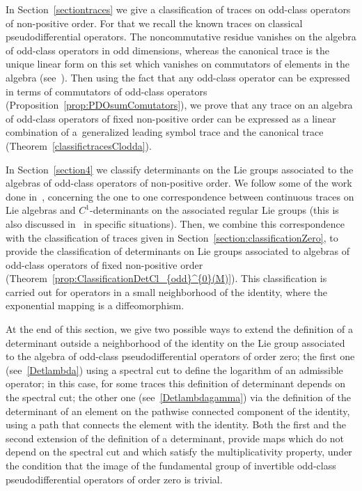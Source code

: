 \documentclass[pdftex]{sigma}
\begin{document}
In Section~\ref{sectiontraces} we give a classif\/ication of traces on odd-class operators of non-positive order. For that we recall the known traces on classical pseudodif\/ferential operators. The noncommutative residue vanishes on the algebra of odd-class operators in odd dimensions, whereas the canonical trace is the unique linear form on this set which vanishes on commutators of elements in the algebra (see~\cite{maniccia}). Then using the fact that any odd-class operator can be expressed in terms of commutators of odd-class operators (Proposition~\ref{prop:PDOsumComutators}), we prove that any trace on an algebra of odd-class operators of f\/ixed non-positive order can be expressed as a linear combination of a~generalized leading symbol trace and the canonical trace (Theorem~\ref{classifictracesClodda}).

In Section~\ref{section4} we classify determinants on the Lie groups associated to the algebras of odd-class operators of non-positive order. We follow some of the work done in~\cite{lescure}, concerning the one to one correspondence between continuous traces on Lie algebras and $C^1$-determinants on the associated regular Lie groups (this is also discussed in~\cite{HarpeSkandalis} in specif\/ic situations). Then, we combine this correspondence with the classif\/ication of traces given in Section~\ref{section:classificationZero}, to provide the classif\/ication of determinants on Lie groups associated to algebras of odd-class operators of f\/ixed non-positive order (Theorem~\ref{prop:ClassificationDetCl_{odd}^{0}(M)}). This classif\/ication is carried out for operators in a small neighborhood of the identity, where the exponential mapping is a dif\/feomorphism.

 At the end of this section, we give two possible ways to extend the def\/inition of a determinant outside a neighborhood of the identity on the Lie group associated to the algebra of odd-class pseudodif\/ferential operators of order zero; the f\/irst one (see~\eqref{Detlambda}) using a spectral cut to def\/ine the logarithm of an admissible operator; in this case, for some traces this def\/inition of determinant depends on the spectral cut; the other one (see~\eqref{Detlambdagamma}) via the def\/inition of the determinant of an element on the pathwise connected component of the identity, using a path that connects the element with the identity. Both the f\/irst and the second extension of the def\/inition of a determinant, provide maps which do not depend on the spectral cut and which satisfy the multiplicativity property, under the condition that the image of the fundamental group of invertible odd-class pseudodif\/ferential operators of order zero is trivial.
\end{document}
